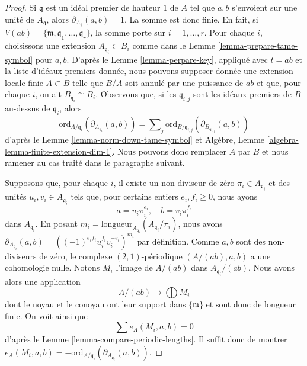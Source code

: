 \begin{proof}
Si $\mathfrak q$ est un idéal premier de hauteur $1$ de $A$ tel que $a, b$
s'envoient sur une unité de $A_\mathfrak q$, alors $\partial_{A_\mathfrak q}(a, b) = 1$.
La somme est donc finie. En fait, si
$V(ab) = \{\mathfrak m, \mathfrak q_1, \ldots, \mathfrak q_r\}$,
la somme porte sur $i = 1, \ldots, r$.
Pour chaque $i$, choisissons une extension $A_{\mathfrak q_i} \subset B_i$
comme dans le Lemme \ref{lemma-prepare-tame-symbol} pour $a, b$.
D'après le Lemme \ref{lemma-perpare-key}, appliqué avec $t = ab$ et la liste d'idéaux premiers donnée,
nous pouvons supposer donnée une extension locale finie $A \subset B$
telle que $B/A$ soit annulé par une puissance de $ab$ et que,
pour chaque $i$, on ait $B_{\mathfrak q_i} \cong B_i$.
Observons que, si les $\mathfrak q_{i, j}$ sont les idéaux premiers de $B$
au-dessus de $\mathfrak q_i$, alors
$$
\text{ord}_{A/\mathfrak q_i}(\partial_{A_{\mathfrak q_i}}(a, b))
=
\sum\nolimits_j
\text{ord}_{B/\mathfrak q_{i, j}}(\partial_{B_{\mathfrak q_{i, j}}}(a, b))
$$
d'après le Lemme \ref{lemma-norm-down-tame-symbol} et
Algèbre, Lemme \ref{algebra-lemma-finite-extension-dim-1}.
Nous pouvons donc remplacer $A$ par $B$ et
nous ramener au cas traité dans le paragraphe suivant.

\medskip\noindent
Supposons que, pour chaque $i$, il existe un non-diviseur de zéro
$\pi_i \in A_{\mathfrak q_i}$ et des unités $u_i, v_i \in A_{\mathfrak q_i}$
tels que, pour certains entiers $e_i, f_i \geq 0$, nous ayons
$$
a = u_i \pi_i^{e_i},\quad b = v_i \pi_i^{f_i}
$$
dans $A_{\mathfrak q_i}$. En posant
$m_i = \text{longueur}_{A_{\mathfrak q_i}}(A_{\mathfrak q_i}/\pi_i)$,
nous avons
$\partial_{A_{\mathfrak q_i}}(a, b) =
((-1)^{e_if_i}u_i^{f_i}v_i^{-e_i})^{m_i}$ par définition.
Comme $a, b$ sont des non-diviseurs de zéro, le
complexe $(2, 1)$-périodique $(A/(ab), a, b)$ a une cohomologie nulle.
Notons $M_i$ l'image de $A/(ab)$ dans $A_{\mathfrak q_i}/(ab)$.
Nous avons alors une application
$$
A/(ab) \longrightarrow \bigoplus M_i
$$
dont le noyau et le conoyau ont leur support dans $\{\mathfrak m\}$
et sont donc de longueur finie. On voit ainsi que
$$
\sum e_A(M_i, a, b) = 0
$$
d'après le Lemme \ref{lemma-compare-periodic-lengths}. Il suffit donc de montrer
$e_A(M_i, a, b) =
- \text{ord}_{A/\mathfrak q_i}(\partial_{A_{\mathfrak q_i}}(a, b))$.


\end{proof}
